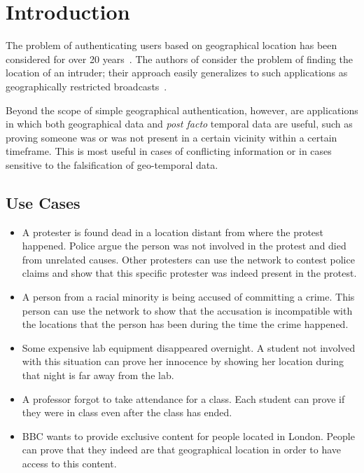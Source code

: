 \section{Introduction}

The problem of authenticating users based on geographical location
has been considered for over 20 years~\cite{denning_1996}.
The authors of \cite{denning_1996} consider the problem of finding
the location of an intruder;
their approach easily generalizes to such applications as
geographically restricted broadcasts~\cite{gdpr}.

Beyond the scope of simple geographical authentication, however,
are applications in which both geographical data and \textit{post facto}
temporal data are useful, such as
proving someone was or was not present in a certain vicinity within a
certain timeframe.
This is most useful in cases of conflicting information or in cases sensitive to
the falsification of geo-temporal data.

\subsection{Use Cases}

\begin{itemize}
	\item A protester is found dead in a location distant from where the protest happened.
		Police argue the person was not involved in the protest
		and died from unrelated causes.
		Other protesters can use the network to contest police claims
		and show that this specific protester was indeed present in the protest.

	\item A person from a racial minority is being accused of committing a crime.
		This person can use the network to show that the accusation
		is incompatible with the locations that the person has been
		during the time the crime happened.

	\item Some expensive lab equipment disappeared overnight.
		A student not involved with this situation
		can prove her innocence by showing her location during that night
		is far away from the lab.

	\item A professor forgot to take attendance for a class.
		Each student can prove if they were in class
		even after the class has ended.

	\item BBC wants to provide exclusive content for people located in London.
		People can prove that they indeed are that geographical location
		in order to have access to this content.
\end{itemize}

